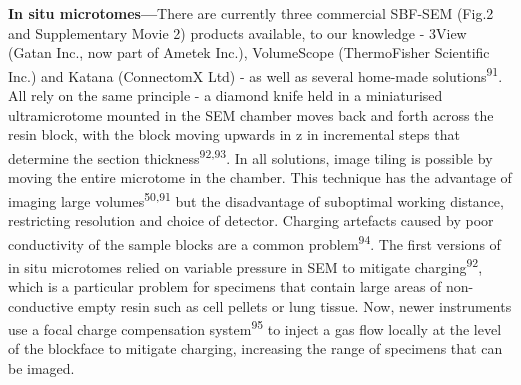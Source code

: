 \documentclass{article}
\begin{document}
\textbf{In situ microtomes—}There are currently three commercial SBF-SEM (Fig.2 and Supplementary Movie 2) products available, to our knowledge - 3View (Gatan Inc., now part of Ametek Inc.), VolumeScope (ThermoFisher Scientific Inc.) and Katana (ConnectomX Ltd) - as well as several home-made solutions\textsuperscript{91}. All rely on the same principle - a diamond knife held in a miniaturised ultramicrotome mounted in the SEM chamber moves back and forth across the resin block, with the block moving upwards in z in incremental steps that determine the section thickness\textsuperscript{92,93}. In all solutions, image tiling is possible by moving the entire microtome in the chamber. This technique has the advantage of imaging large volumes\textsuperscript{50,91} but the disadvantage of suboptimal working distance, restricting resolution and choice of detector. Charging artefacts caused by poor conductivity of the sample blocks are a common problem\textsuperscript{94}. The first versions of in situ microtomes relied on variable pressure in SEM to mitigate charging\textsuperscript{92}, which is a particular problem for specimens that contain large areas of non-conductive empty resin such as cell pellets or lung tissue. Now, newer instruments use a focal charge compensation system\textsuperscript{95} to inject a gas flow locally at the level of the blockface to mitigate charging, increasing the range of specimens that can be imaged.
\end{document}

